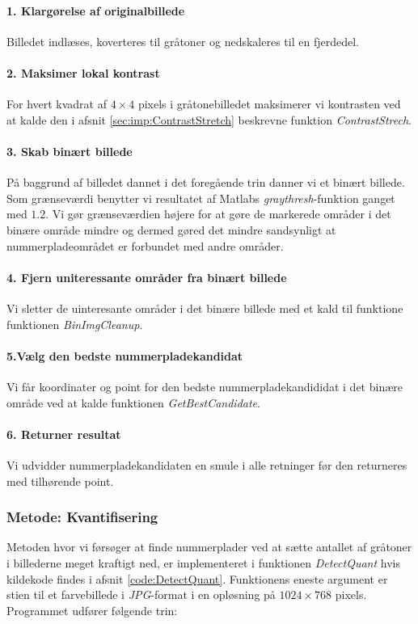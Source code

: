 \paragraph{1. Klargørelse af originalbillede}
Billedet indlæses, koverteres til gråtoner og nedskaleres til en fjerdedel. 

\paragraph{2. Maksimer lokal kontrast}
For hvert kvadrat af $4 \times 4$ pixels i gråtonebilledet maksimerer vi kontrasten ved at kalde den i afsnit \vref{sec:imp:ContrastStretch} beskrevne funktion \textit{ContrastStrech}.

\paragraph{3. Skab binært billede}
På baggrund af billedet dannet i det foregående trin danner vi et binært billede. Som grænseværdi benytter vi resultatet af Matlabs \textit{graythresh}-funktion ganget med $1.2$. Vi gør grænseværdien højere for at gøre de markerede områder i det binære område mindre og dermed gøred det mindre sandsynligt at nummerpladeområdet er forbundet med andre områder.

\paragraph{4. Fjern uniteressante områder fra binært billede}
Vi sletter de uinteresante områder i det binære billede med et kald til funktione funktionen \textit{BinImgCleanup}.

\paragraph{5.Vælg den bedste nummerpladekandidat}
Vi får koordinater og point for den bedste nummerpladekandididat i det binære område ved at kalde funktionen \textit{GetBestCandidate}. 

\paragraph{6. Returner resultat}
Vi udvidder nummerpladekandidaten en smule i alle retninger før den returneres med tilhørende point.

\subsubsection{Metode: Kvantifisering}
Metoden hvor vi førsøger at finde nummerplader ved at sætte antallet af gråtoner i billederne meget kraftigt ned, er implementeret i funktionen \textit{DetectQuant} hvis kildekode findes i afsnit \vref{code:DetectQuant}. Funktionens eneste argument er stien til et farvebillede i \textit{JPG}-format i en opløsning på $1024 \times 768$ pixels. Programmet udfører følgende trin:

